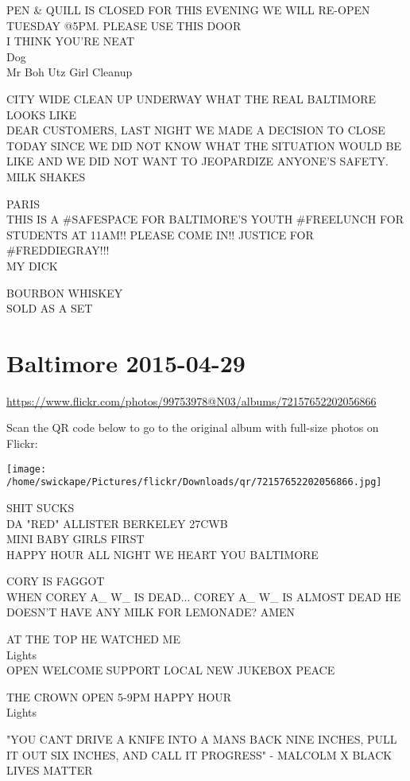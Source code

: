 \documentclass[10pt,letterpaper]{article}
\begin{document}
PEN \& QUILL IS CLOSED FOR THIS EVENING WE WILL RE{-}OPEN TUESDAY @5PM.  PLEASE USE THIS DOOR\\
I THINK YOU'RE NEAT\\
Dog\\
Mr Boh Utz Girl Cleanup

CITY WIDE CLEAN UP UNDERWAY WHAT THE REAL BALTIMORE LOOKS LIKE\\
DEAR CUSTOMERS, LAST NIGHT WE MADE A DECISION TO CLOSE TODAY SINCE WE DID NOT KNOW WHAT THE SITUATION WOULD BE LIKE AND WE DID NOT WANT TO JEOPARDIZE ANYONE'S SAFETY.\\
MILK SHAKES

PARIS\\
THIS IS A \#SAFESPACE FOR BALTIMORE'S YOUTH \#FREELUNCH FOR STUDENTS AT 11AM!!  PLEASE COME IN!!  JUSTICE FOR \#FREDDIEGRAY!!!\\
MY DICK

BOURBON WHISKEY\\
SOLD AS A SET


\section*{Baltimore 2015-04-29}

\url{https://www.flickr.com/photos/99753978@N03/albums/72157652202056866}

Scan the QR code below to go to the original album with full-size photos on Flickr:

\texttt{[image: /home/swickape/Pictures/flickr/Downloads/qr/72157652202056866.jpg]}


SHIT SUCKS\\
DA "RED" ALLISTER BERKELEY 27CWB\\
MINI BABY GIRLS FIRST\\
HAPPY HOUR ALL NIGHT WE HEART YOU BALTIMORE

CORY IS FAGGOT\\
WHEN COREY A\_ W\_ IS DEAD...  COREY A\_ W\_ IS ALMOST DEAD HE DOESN'T HAVE ANY MILK FOR LEMONADE?  AMEN

AT THE TOP HE WATCHED ME\\
Lights\\
OPEN WELCOME SUPPORT LOCAL NEW JUKEBOX PEACE

THE CROWN OPEN 5{-}9PM HAPPY HOUR\\
Lights

"YOU CANT DRIVE A KNIFE INTO A MANS BACK NINE INCHES, PULL IT OUT SIX INCHES, AND CALL IT PROGRESS" {-} MALCOLM X BLACK LIVES MATTER
\end{document}
